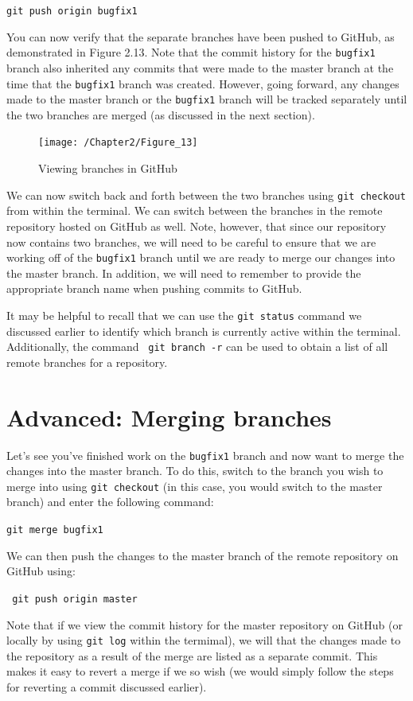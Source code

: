 \documentclass{book}
\begin{document}
\texttt{git push origin bugfix1} 

You can now verify that the separate branches have been pushed to GitHub, as demonstrated in Figure 2.13. Note that the commit history for the \texttt{bugfix1} branch also inherited any commits that were made to the master branch at the time that the \texttt{bugfix1} branch was created. However, going forward, any changes made to the master branch or the \texttt{bugfix1} branch will be tracked separately until the two branches are merged (as discussed in the next section).

\begin{figure}[h]
	\caption{Viewing branches in GitHub}
	\centering\texttt{[image: /Chapter2/Figure\_13]}
\end{figure}

We can now switch back and forth between the two branches using \texttt{git checkout} from within the terminal. We can switch between the branches in the remote repository hosted on GitHub as well. Note, however, that since our repository now contains two branches, we will need to be careful to ensure that we are working off of the \texttt{bugfix1} branch until we are ready to merge our changes into the master branch. In addition, we will need to remember to provide the appropriate branch name when pushing commits to GitHub.

It may be helpful to recall that we can use the \texttt{git status} command we discussed earlier to identify which branch is currently active within the terminal. Additionally, the command \texttt{ git branch -r} can be used to obtain a list of all remote branches for a repository.

\section{Advanced: Merging branches}

Let's see you've finished work on the \texttt{bugfix1} branch and now want to merge the changes into the master branch. To do this, switch to the branch you wish to merge into using \texttt{git checkout} (in this case, you would switch to the master branch) and enter the following command:

\texttt{git merge bugfix1}

We can then push the changes to the master branch of the remote repository on GitHub using:

\texttt{ git push origin master}

Note that if we view the commit history for the master repository on GitHub (or locally by using \texttt{git log} within the termimal), we will that the changes made to the repository as a result of the merge are listed as a separate commit. This makes it easy to revert a merge if we so wish (we would simply follow the steps for reverting a commit discussed earlier).
\end{document}
